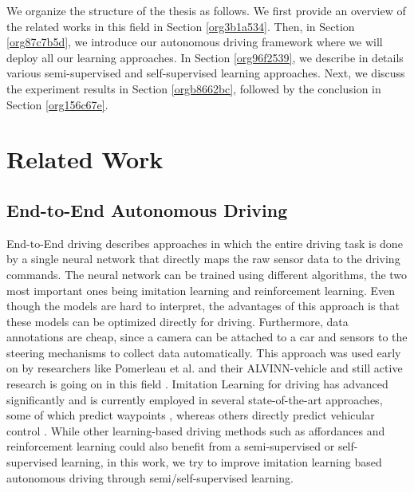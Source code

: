 \documentclass[letterpaper, 12pt]{book}
\theoremstyle{definition}
\theoremstyle{definition}
\theoremstyle{definition}
\theoremstyle{definition}
\theoremstyle{definition}
\begin{document}
We organize the structure of the thesis as follows. We first provide an overview
of the related works in this field in Section \ref{org3b1a534}. Then, in Section \ref{org87c7b5d}, we introduce
our autonomous driving framework where we will deploy all our learning
approaches. In Section \ref{org96f2539}, we describe in details various
semi-supervised and self-supervised learning approaches. Next, we discuss the
experiment results in Section \ref{orgb8662bc}, followed by the conclusion in Section \ref{org156c67e}.

\section{Related Work \label{org3b1a534}}
\label{sec:org182c79a}
\subsection{End-to-End Autonomous Driving}
\label{sec:org7a8a387}
End-to-End driving describes approaches in which the entire driving task is done
by a single neural network that directly maps the raw sensor data to the driving
commands. The neural network can be trained using different algorithms, the two
most important ones being imitation learning and reinforcement learning. Even
though the models are hard to interpret, the advantages of this approach is that
these models can be optimized directly for driving. Furthermore, data
annotations are cheap, since a camera can be attached to a car and sensors to
the steering mechanisms to collect data automatically. This approach was used
early on by researchers like Pomerleau et al. and their ALVINN-vehicle
\cite{Pomerleau1988} and still active research is going on in this field
\cite{Janai2020,Tampuu2020}. Imitation Learning for driving has advanced
significantly \cite{Bojarski2016,Codevilla2017,Mueller2018} and is currently
employed in several state-of-the-art approaches, some of which predict waypoints
\cite{Casas2021,Chen2019,Filos2020}, whereas others directly predict vehicular
control
\cite{Behl2020,Buehler2020,Codevilla2019,9157137,Xiao2019,Prakash2020}. While
other learning-based driving methods such as affordances
\cite{Sauer2018,Xiao2020} and reinforcement learning
\cite{chen2021learning,Toromanoff2019,Wang2020a} could also benefit from a
semi-supervised or self-supervised learning, in this work, we try to improve
imitation learning based autonomous driving through semi/self-supervised
learning.
\end{document}
